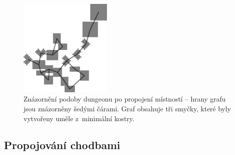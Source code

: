 \begin{figure}[hbt]
    \centering
    \includegraphics[width=0.4\textwidth]{obrazky/navrh3.png}
    \caption{Znázornění podoby dungeonu po propojení místností -- hrany grafu jsou znázorněny šedými čárami. Graf obsahuje tři smyčky, které byly vytvořeny uměle z~minimální kostry.}
    \label{img:navrh3}
\end{figure}


\subsection{Propojování chodbami}


